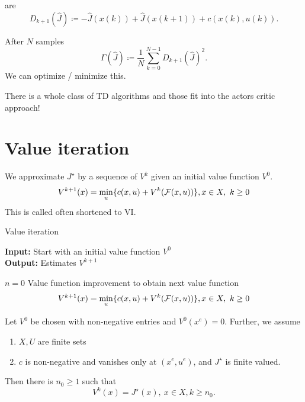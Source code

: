  are 
\[D_{k+1}(\hat{J})\coloneqq -\hat{J}(x(k))+\hat{J}(x(k+1))+c(x(k),u(k)).\]

After \(N\) samples 
\[\Gamma(\hat{J})\coloneqq \frac{1}{N}\sum_{k=0}^{N-1} D_{k+1}(\hat{J})^2.\]
We can optimize / minimize this.

There is a whole class of TD algorithms and those fit into the actors critic approach!


\section{Value iteration}

We approximate \(J^\star\) by a sequence of \(V^k\) given an initial value function \(V^0\).
\[V^{k+1}(x)=\min_{u}\{c(x,u)+V^k(\mathcal{F}(x,u))\}, x\in X,\ k\geq 0\]
This is called  often shortened to VI.

\begin{algorithm}[H]
    \caption{Value iteration}
    \textbf{Input:} Start with an initial value function \(V^0\)\\
    \textbf{Output:} Estimates \(V^{k+1}\)
    \begin{algorithmic}
    \State \(n=0\)
        \State Value function improvement to obtain next value function
            \[V^{k+1}(x)=\min_{u}\{c(x,u)+V^k(\mathcal{F}(x,u))\}, x\in X,\ k\geq 0\]
    \EndWhile
    \end{algorithmic}
\end{algorithm}

\begin{proposition}\label{prop:1.15}
    Let \(V^0\) be chosen with non-negative entries and \(V^0(x^e)=0\). Further,
    we assume
    \begin{enumerate}
        \item \(X,U\) are finite sets 
        \item \(c\) is non-negative and vanishes only at \((x^e,u^e)\), and \(J^\star\) is finite valued.
    \end{enumerate}
    Then there is \(n_0\geq 1\) such that 
    \[V^k(x)=J^\star(x), \ x\in X,k\geq n_0.\]
\end{proposition}


